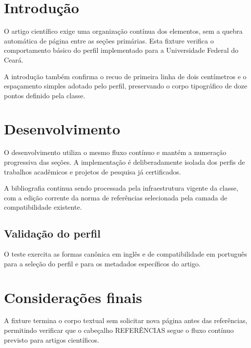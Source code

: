 \documentclass{abntexto-ufc}
\begin{document}
\ifdefined\UFCArticleCompatibilitySetup
  \imprimircabecalhoartigo
\else
  \ufcPrintArticleHeader
\fi


\ifdefined\UFCArticleCompatibilitySetup
  \imprimirdatasartigo
\else
  \ufcPrintArticleDates
\fi

\section{Introdução}
O artigo científico exige uma organização contínua dos elementos, sem a quebra automática de página entre as seções primárias. Esta fixture verifica o comportamento básico do perfil implementado para a Universidade Federal do Ceará.

A introdução também confirma o recuo de primeira linha de dois centímetros e o espaçamento simples adotado pelo perfil, preservando o corpo tipográfico de doze pontos definido pela classe.

\section{Desenvolvimento}
O desenvolvimento utiliza o mesmo fluxo contínuo e mantém a numeração progressiva das seções. A implementação é deliberadamente isolada dos perfis de trabalhos acadêmicos e projetos de pesquisa já certificados.

A bibliografia continua sendo processada pela infraestrutura vigente da classe, com a edição corrente da norma de referências selecionada pela camada de compatibilidade existente.

\subsection{Validação do perfil}
O teste exercita as formas canônica em inglês e de compatibilidade em português para a seleção do perfil e para os metadados específicos do artigo.

\section{Considerações finais}
A fixture termina o corpo textual sem solicitar nova página antes das referências, permitindo verificar que o cabeçalho REFERÊNCIAS segue o fluxo contínuo previsto para artigos científicos.

\nocite{silva2020}
\imprimirreferencias
\end{document}
